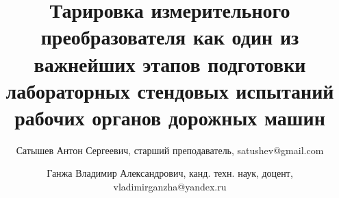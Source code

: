 \newcommand{\mainAuthor}{Сатышев Антон Сергеевич}
\newcommand{\articleTitle}{Тарировка измерительного преобразователя как один из важнейших этапов подготовки лабораторных стендовых испытаний рабочих органов дорожных машин}
\newcommand{\keywords}{снежно-ледяные образования, дисковый режущий инструмент, силовые параметры, радиус закругления, лёд, радиус закругления рабой кромки}


\author{\mainAuthor, старший преподаватель, satushev@gmail.com}
\author{Ганжа Владимир Александрович, канд. техн. наук, доцент, vladimirganzha@yandex.ru}

\title{\articleTitle}
\date{}